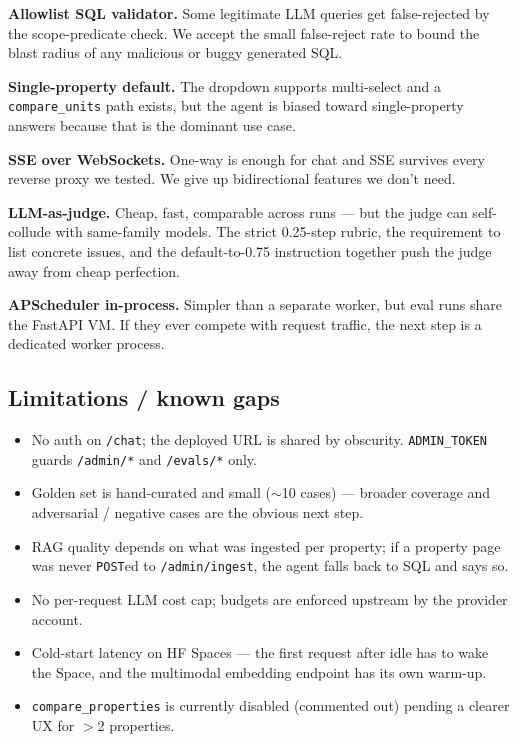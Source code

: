 \documentclass[11pt,a4paper]{article}
\begin{document}
\begin{tradeoffbox}
\textbf{Allowlist SQL validator.} Some legitimate LLM queries get false-rejected by the
scope-predicate check. We accept the small false-reject rate to bound the blast radius
of any malicious or buggy generated SQL.
\end{tradeoffbox}

\begin{tradeoffbox}
\textbf{Single-property default.} The dropdown supports multi-select and a
\texttt{compare\_units} path exists, but the agent is biased toward single-property
answers because that is the dominant use case.
\end{tradeoffbox}

\begin{tradeoffbox}
\textbf{SSE over WebSockets.} One-way is enough for chat and SSE survives every reverse
proxy we tested. We give up bidirectional features we don't need.
\end{tradeoffbox}

\begin{tradeoffbox}
\textbf{LLM-as-judge.} Cheap, fast, comparable across runs --- but the judge can
self-collude with same-family models. The strict 0.25-step rubric, the requirement to
list concrete issues, and the default-to-0.75 instruction together push the judge away
from cheap perfection.
\end{tradeoffbox}

\begin{tradeoffbox}
\textbf{APScheduler in-process.} Simpler than a separate worker, but eval runs share the
FastAPI VM. If they ever compete with request traffic, the next step is a dedicated
worker process.
\end{tradeoffbox}

\subsection{Limitations / known gaps}

\begin{itemize}
  \item No auth on \texttt{/chat}; the deployed URL is shared by obscurity. \texttt{ADMIN\_TOKEN} guards \texttt{/admin/*} and \texttt{/evals/*} only.
  \item Golden set is hand-curated and small ($\sim$10 cases) --- broader coverage and adversarial / negative cases are the obvious next step.
  \item RAG quality depends on what was ingested per property; if a property page was never \texttt{POST}ed to \texttt{/admin/ingest}, the agent falls back to SQL and says so.
  \item No per-request LLM cost cap; budgets are enforced upstream by the provider account.
  \item Cold-start latency on HF Spaces --- the first request after idle has to wake the Space, and the multimodal embedding endpoint has its own warm-up.
  \item \texttt{compare\_properties} is currently disabled (commented out) pending a clearer UX for $>$2 properties.
\end{itemize}
\end{document}
